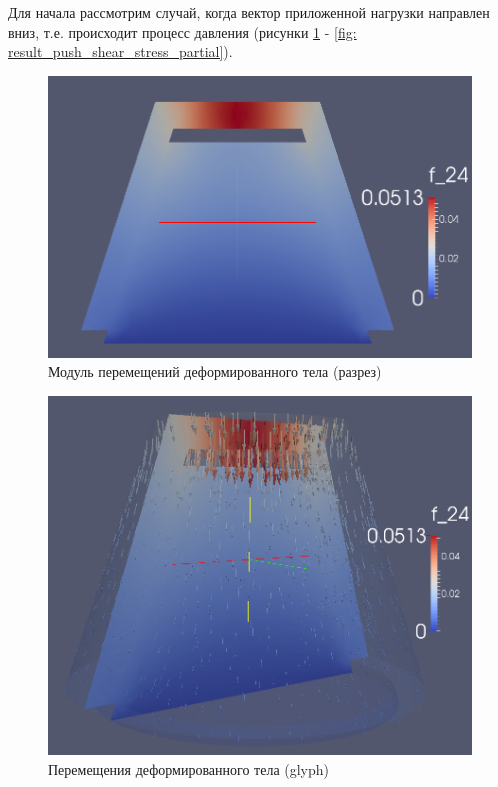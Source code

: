 \documentclass[a4paper, 14pt]{extreport}
\begin{document}
Для начала рассмотрим случай, когда вектор приложенной нагрузки направлен
вниз, т.е. происходит процесс давления (рисунки \ref{fig: result_push_displacement_slice} - 
\ref{fig: result_push_shear_stress_partial}).

\begin{figure}[H]
	\center
	\includegraphics[scale=0.4]{pictures/result_push_displacement_slice.png}
	\caption{Модуль перемещений деформированного тела (разрез)}
	\label{fig: result_push_displacement_slice}
\end{figure}

\begin{figure}[H]
	\center
	\includegraphics[scale=0.5]{pictures/result_push_displacement_glyph.png}
	\caption{Перемещения деформированного тела (glyph)}
	\label{fig: result_push_displacement_glyph}
\end{figure}
\end{document}
